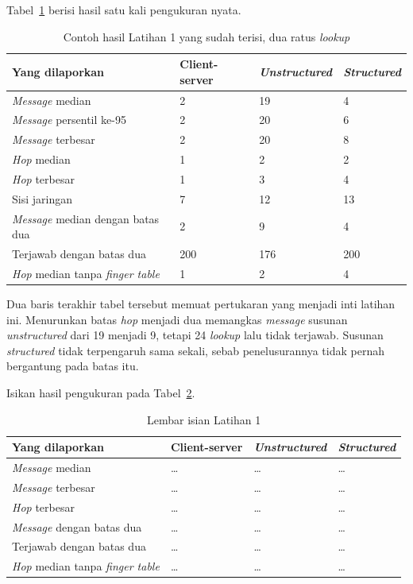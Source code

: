 Tabel~\ref{tab:lat1p2p-contoh} berisi hasil satu kali pengukuran nyata.

\begin{table}[htbp]
  \centering
  \caption{Contoh hasil Latihan 1 yang sudah terisi, dua ratus \textit{lookup}}
  \label{tab:lat1p2p-contoh}
  \begin{tabularx}{\textwidth}{|X|l|l|l|}
    \hline
    \textbf{Yang dilaporkan} & \textbf{Client-server} & \textbf{\textit{Unstructured}} & \textbf{\textit{Structured}} \\
    \hline
    \textit{Message} median & 2 & 19 & 4 \\
    \hline
    \textit{Message} persentil ke-95 & 2 & 20 & 6 \\
    \hline
    \textit{Message} terbesar & 2 & 20 & 8 \\
    \hline
    \textit{Hop} median & 1 & 2 & 2 \\
    \hline
    \textit{Hop} terbesar & 1 & 3 & 4 \\
    \hline
    Sisi jaringan & 7 & 12 & 13 \\
    \hline
    \textit{Message} median dengan batas dua & 2 & 9 & 4 \\
    \hline
    Terjawab dengan batas dua & 200 & 176 & 200 \\
    \hline
    \textit{Hop} median tanpa \textit{finger table} & 1 & 2 & 4 \\
    \hline
  \end{tabularx}
\end{table}

Dua baris terakhir tabel tersebut memuat pertukaran yang menjadi inti latihan
ini. Menurunkan batas \textit{hop} menjadi dua memangkas \textit{message} susunan
\textit{unstructured} dari 19 menjadi 9, tetapi 24 \textit{lookup} lalu tidak
terjawab.
Susunan \textit{structured} tidak terpengaruh sama sekali, sebab penelusurannya tidak
pernah bergantung pada batas itu.

Isikan hasil pengukuran pada Tabel~\ref{tab:lat1p2p-hasil}.

\begin{table}[htbp]
  \centering
  \caption{Lembar isian Latihan 1}
  \label{tab:lat1p2p-hasil}
  \begin{tabularx}{\textwidth}{|X|l|l|l|}
    \hline
    \textbf{Yang dilaporkan} & \textbf{Client-server} & \textbf{\textit{Unstructured}} & \textbf{\textit{Structured}} \\
    \hline
    \textit{Message} median & \dots & \dots & \dots \\
    \hline
    \textit{Message} terbesar & \dots & \dots & \dots \\
    \hline
    \textit{Hop} terbesar & \dots & \dots & \dots \\
    \hline
    \textit{Message} dengan batas dua & \dots & \dots & \dots \\
    \hline
    Terjawab dengan batas dua & \dots & \dots & \dots \\
    \hline
    \textit{Hop} median tanpa \textit{finger table} & \dots & \dots & \dots \\
    \hline
  \end{tabularx}
\end{table}

